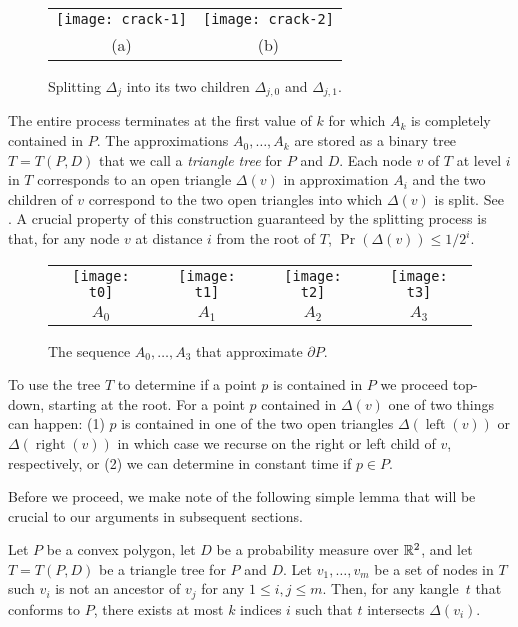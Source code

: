\documentclass[charterfonts,lotsofwhite]{patmorin}
\newcommand{\boundary}{\partial}
\DeclareMathOperator{\lft}{left}
\DeclareMathOperator{\rght}{right}
\newcommand{\kangle}{kangle}
\begin{document}
\begin{figure}
\begin{center}
\begin{tabular}{cc}
\texttt{[image: crack-1]} & \texttt{[image: crack-2]} \\
(a) & (b)
\end{tabular}
\end{center}
\caption{Splitting $\Delta_j$ into its two children $\Delta_{j,0}$ and
$\Delta_{j,1}$.}
\end{figure}

The entire process terminates at the first value of $k$ for which
$A_k$ is completely contained in $P$.  The approximations
$A_0,\ldots,A_k$ are stored as a binary tree $T=T(P,D)$ that we call a
\emph{triangle tree} for $P$ and $D$.  Each node $v$ of $T$ at level
$i$ in $T$ corresponds to an open triangle $\Delta(v)$ in
approximation $A_{i}$ and the two children of $v$ correspond to the
two open triangles into which $\Delta(v)$ is split. See .
A crucial property of this construction guaranteed by the splitting
process is that, for any node $v$ at distance $i$ from the root
of $T$, $\Pr(\Delta(v))\le 1/2^i$.

\begin{figure}
  \begin{center}
    \begin{tabular}{cccc}
      \texttt{[image: t0]} & 
      \texttt{[image: t1]} & 
      \texttt{[image: t2]} & 
      \texttt{[image: t3]} \\
      $A_0$ & $A_1$ & $A_2$ & $A_3$ 
    \end{tabular}
  \end{center}
  \caption{The sequence $A_0,\ldots,A_3$ that approximate $\boundary P$.}
\end{figure}

To use the tree $T$ to determine if a point $p$ is contained in $P$ we
proceed top-down, starting at the root.  For a point $p$ contained in
$\Delta(v)$ one of two things can happen: (1) $p$ is contained in one
of the two open triangles $\Delta(\lft(v))$ or $\Delta(\rght(v))$ in
which case we recurse on the right or left child of $v$, respectively,
or (2) we can determine in constant time if $p\in P$.

Before we proceed, we make note of the following simple lemma that
will be crucial to our arguments in subsequent sections.

\begin{lem}
Let $P$ be a convex polygon, let $D$ be a probability measure over
$\mathbb{R}^2$, and let $T=T(P,D)$ be a triangle tree for $P$ and $D$.
Let $v_1,\ldots,v_m$ be a set of nodes in $T$ such $v_i$ is not an
ancestor of $v_j$ for any $1\le i,j\le m$.  Then, for any \kangle\
$t$ that conforms to $P$, there exists at most $k$ indices $i$ such that
$t$ intersects $\Delta(v_i)$.
\end{lem}
\end{document}
